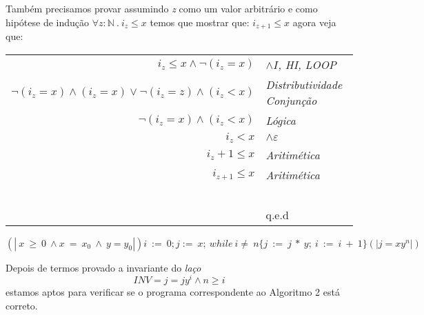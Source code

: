  Também precisamos provar assumindo \emph{z} como um valor arbitrário e como
 hipótese de indução $\forall z : \mathbb{N}\ .\ i_z \leq x$ temos que mostrar
 que: $i_{z+1} \leq x$ agora veja que:
 \begin{center}
     \begin{tabular}{rl}
         \emph{$i_z \leq x \land \neg(i_z = x) $}& \emph{$\land I$, HI, LOOP} \\
         \emph{$\neg(i_z=x) \land (i_z =x) \vee \neg(i_z=z) \land (i_z < x)$}&\emph{Distributividade Conjunção} \\
         \emph{$\neg(i_z =x) \land (i_z < x)$}& \emph{Lógica} \\
         \emph{$i_z < x$}& \emph{$\land \varepsilon$} \\
         \emph{$i_z +1 \leq x$}& \emph{Aritimética} \\
         \emph{$i_{z+1} \leq x$}& \emph{Aritimética} \\
         ~&~\\
         ~&q.e.d\\
     \end{tabular}
 \end{center}
$$(\!|\ x\ \geq\ 0\ \wedge x\ =\ x_0\ \wedge\ y=y_0|\!) i\ :=\ 0; j :=\ x;\
while\ i \neq\ n \{j\ :=\ j\ *\ y;\ i\ :=\ i\ +\ 1\}(\!| j=x y^n |\!) $$

Depois de termos provado a invariante do \emph{laço} \[INV = j = jy^i \land n
\geq i\] estamos aptos para verificar se o programa correspondente ao Algoritmo
2 está correto.

\newpage

